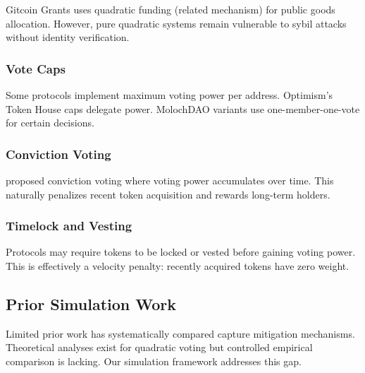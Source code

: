 Gitcoin Grants uses quadratic funding (related mechanism) for public goods allocation. However, pure quadratic systems remain vulnerable to sybil attacks without identity verification.

\subsubsection{Vote Caps}

Some protocols implement maximum voting power per address. Optimism's Token House caps delegate power. MolochDAO variants use one-member-one-vote for certain decisions.

\subsubsection{Conviction Voting}

\citet{emmett2019conviction} proposed conviction voting where voting power accumulates over time. This naturally penalizes recent token acquisition and rewards long-term holders.

\subsubsection{Timelock and Vesting}

Protocols may require tokens to be locked or vested before gaining voting power. This is effectively a velocity penalty: recently acquired tokens have zero weight.

\subsection{Prior Simulation Work}

Limited prior work has systematically compared capture mitigation mechanisms. Theoretical analyses exist for quadratic voting \citep{lalley2018quadratic} but controlled empirical comparison is lacking. Our simulation framework addresses this gap.
